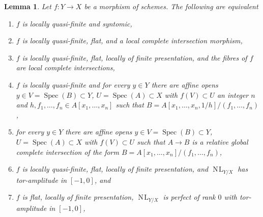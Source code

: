 \documentclass{stacks-project}
\theoremstyle{plain}
\newtheorem{lemma}[subsection]{Lemma}
\theoremstyle{definition}
\theoremstyle{remark}
\numberwithin{equation}{subsection}
\def\Spec{\mathop{\mathrm{Spec}}}
\def\NL{\mathop{N\!L}\nolimits}
\begin{document}
\begin{lemma}
\label{lemma-syntomic-quasi-finite}
Let $f : Y \to X$ be a morphism of schemes. The following are equivalent
\begin{enumerate}
\item $f$ is locally quasi-finite and syntomic,
\item $f$ is locally quasi-finite, flat, and a local complete intersection
morphism,
\item $f$ is locally quasi-finite, flat, locally of finite presentation,
and the fibres of $f$ are local complete intersections,
\item $f$ is locally quasi-finite and for every $y \in Y$ there are
affine opens $y \in V = \Spec(B) \subset Y$, $U = \Spec(A) \subset X$
with $f(V) \subset U$ an integer $n$ and
$h, f_1, \ldots, f_n \in A[x_1, \ldots, x_n]$ such that
$B = A[x_1, \ldots, x_n, 1/h]/(f_1, \ldots, f_n)$,
\item for every $y \in Y$ there are affine opens
$y \in V = \Spec(B) \subset Y$, $U = \Spec(A) \subset X$
with $f(V) \subset U$ such that $A \to B$ is a relative global complete
intersection of the form $B = A[x_1, \ldots, x_n]/(f_1, \ldots, f_n)$,
\item $f$ is locally quasi-finite, flat, locally of finite presentation,
and $\NL_{Y/X}$ has tor-amplitude in $[-1, 0]$, and
\item $f$ is flat, locally of finite presentation,
$\NL_{Y/X}$ is perfect of rank $0$ with tor-amplitude in $[-1, 0]$,
\end{enumerate}
\end{lemma}
\end{document}
